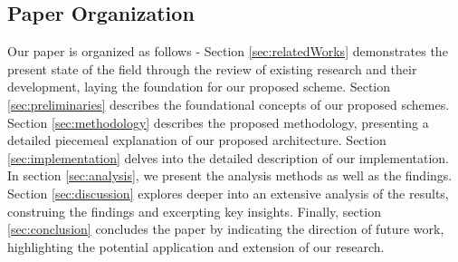 \documentclass[a4paper]{cas-sc}
\begin{document}
\subsection{Paper Organization}
Our paper is organized as follows - Section \ref{sec:relatedWorks} demonstrates the present state of the field through the review of existing research and their development, laying the foundation for our proposed scheme. Section \ref{sec:preliminaries} describes the foundational concepts of our proposed schemes. Section \ref{sec:methodology} describes the proposed methodology, presenting a detailed piecemeal explanation of our proposed architecture. Section \ref{sec:implementation} delves into the detailed description of our implementation. In section \ref{sec:analysis}, we present the analysis methods as well as the findings. Section \ref{sec:discussion} explores deeper into an extensive analysis of the results, construing the findings and excerpting key insights. Finally, section \ref{sec:conclusion} concludes the paper by indicating the direction of future work, highlighting the potential application and extension of our research.


\end{document}
